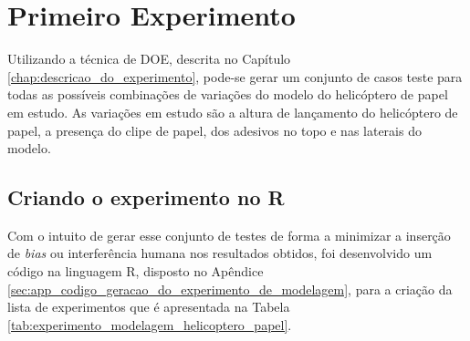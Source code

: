 \chapter{Primeiro Experimento}
\label{chap:primeiro_experimento}


Utilizando a técnica de \ac{DOE}, descrita no Capítulo \ref{chap:descricao_do_experimento}, pode-se gerar um conjunto de casos teste para todas as possíveis combinações de variações do modelo do helicóptero de papel em estudo. As variações em estudo são a altura de lançamento do helicóptero de papel, a presença do clipe de papel, dos adesivos no topo e nas laterais do modelo.

\section{Criando o experimento no R}
\label{sec:primeiro_experimento_criando o experimento_no_R}


Com o intuito de gerar esse conjunto de testes de forma a minimizar a inserção de \textit{bias} ou interferência humana nos resultados obtidos, foi desenvolvido um código na linguagem R, disposto no Apêndice \ref{sec:app_codigo_geracao_do_experimento_de_modelagem}, para a criação da lista de experimentos que é apresentada na Tabela \ref{tab:experimento_modelagem_helicoptero_papel}.

